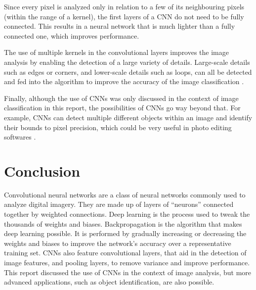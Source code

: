 ﻿\documentclass[12pt,a4paper,notitlepage]{article}
\begin{document}
Since every pixel is analyzed only in relation to a few of its neighbouring pixels (within the range of a kernel), the first layers of a CNN do not need to be fully connected. This results in a neural network that is much lighter than a fully connected one, which improves performance. \cite{aghdam_guide_2017}

The use of multiple kernels in the convolutional layers improves the image analysis by enabling the detection of a large variety of details. Large-scale details such as edges or corners, and lower-scale details such as loops, can all be detected and fed into the algorithm to improve the accuracy of the image classification \cite{saha_comprehensive_2018}.

Finally, although the use of CNNs was only discussed in the context of image classification in this report, the possibilities of CNNs go way beyond that. For example, CNNs can detect multiple different objects within an image and identify their bounds to pixel precision, which could be very useful in photo editing softwares \cite{brownlee_gentle_2019}.

\section{Conclusion}
Convolutional neural networks are a class of neural networks commonly used to analyze digital imagery. They are made up of layers of “neurons” connected together by  weighted connections. Deep learning is the process used to tweak the thousands of weights and biases. Backpropagation is the algorithm that makes deep learning possible. It is performed by gradually increasing or decreasing the weights and biases to improve the network's accuracy over a representative training set. CNNs also feature convolutional layers, that aid in the detection of image features, and pooling layers, to remove variance and improve performance. This report discussed the use of CNNs in the context of image analysis, but more advanced applications, such as object identification, are also possible.

\clearpage
\begin{flushleft}


\end{flushleft}
\end{document}
